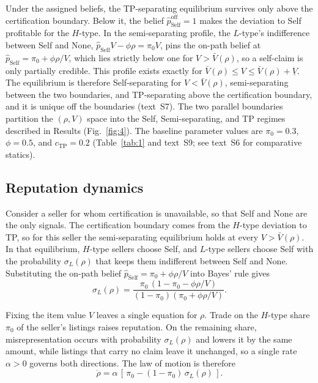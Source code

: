 \documentclass[11pt,letterpaper]{article}
\theoremstyle{definition}
\begin{document}
Under the assigned beliefs, the TP-separating equilibrium survives only above the certification boundary. Below it, the belief $\hat{p}_{\text{Self}}^{\text{off}} = 1$ makes the deviation to Self profitable for the $H$-type. In the semi-separating profile, the $L$-type's indifference between Self and None, $\hat{p}_{\text{Self}} V - \phi\rho = \pi_0 V$, pins the on-path belief at $\hat{p}_{\text{Self}} = \pi_0 + \phi\rho/V$, which lies strictly below one for $V > \bar{V}(\rho)$, so a self-claim is only partially credible. This profile exists exactly for $\bar{V}(\rho) \leq V \leq \bar{V}(\rho) + \underline{V}$. The equilibrium is therefore Self-separating for $V < \bar{V}(\rho)$, semi-separating between the two boundaries, and TP-separating above the certification boundary, and it is unique off the boundaries (text~S7). The two parallel boundaries partition the $(\rho, V)$ space into the Self, Semi-separating, and TP regimes described in Results (Fig.~\ref{fig:4}). The baseline parameter values are $\pi_0 = 0.3$, $\phi = 0.5$, and $c_{\text{TP}} = 0.2$ (Table~\ref{tab:1} and text~S9; see text~S6 for comparative statics).

\subsection*{Reputation dynamics}

Consider a seller for whom certification is unavailable, so that Self and None are the only signals. The certification boundary comes from the $H$-type deviation to TP, so for this seller the semi-separating equilibrium holds at every $V > \bar{V}(\rho)$. In that equilibrium, $H$-type sellers choose Self, and $L$-type sellers choose Self with the probability $\sigma_L(\rho)$ that keeps them indifferent between Self and None. Substituting the on-path belief $\hat{p}_{\text{Self}} = \pi_0 + \phi\rho/V$ into Bayes' rule gives
\begin{equation*}
\sigma_L(\rho) = \frac{\pi_0\,(1 - \pi_0 - \phi\rho/V)}{(1 - \pi_0)(\pi_0 + \phi\rho/V)} .
\end{equation*}

Fixing the item value $V$ leaves a single equation for $\rho$. Trade on the $H$-type share $\pi_0$ of the seller's listings raises reputation. On the remaining share, misrepresentation occurs with probability $\sigma_L(\rho)$ and lowers it by the same amount, while listings that carry no claim leave it unchanged, so a single rate $\alpha > 0$ governs both directions. The law of motion is therefore
\begin{equation*}
\dot{\rho} = \alpha\,[\,\pi_0 - (1 - \pi_0)\,\sigma_L(\rho)\,] .
\end{equation*}
\end{document}
